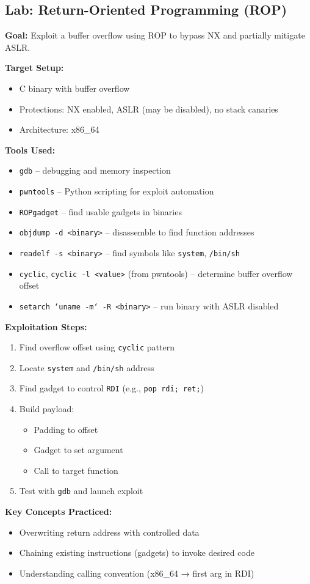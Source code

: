 \subsection{Lab: Return-Oriented Programming (ROP)}
{
\textbf{Goal:} Exploit a buffer overflow using ROP to bypass NX and partially mitigate ASLR.

\textbf{Target Setup:}
\begin{itemize}[noitemsep]
  \item C binary with buffer overflow
  \item Protections: NX enabled, ASLR (may be disabled), no stack canaries
  \item Architecture: x86\_64
\end{itemize}

\textbf{Tools Used:}
\begin{itemize}[noitemsep]
  \item \texttt{gdb} – debugging and memory inspection
  \item \texttt{pwntools} – Python scripting for exploit automation
  \item \texttt{ROPgadget} – find usable gadgets in binaries
  \item \texttt{objdump -d <binary>} – disassemble to find function addresses
  \item \texttt{readelf -s <binary>} – find symbols like \texttt{system}, \texttt{/bin/sh}
  \item \texttt{cyclic}, \texttt{cyclic -l <value>} (from pwntools) – determine buffer overflow offset
  \item \texttt{setarch `uname -m` -R <binary>} – run binary with ASLR disabled
\end{itemize}

\textbf{Exploitation Steps:}
\begin{enumerate}[noitemsep]
  \item Find overflow offset using \texttt{cyclic} pattern
  \item Locate \texttt{system} and \texttt{/bin/sh} address
  \item Find gadget to control \texttt{RDI} (e.g., \texttt{pop rdi; ret;})
  \item Build payload:
    \begin{itemize}
      \item Padding to offset
      \item Gadget to set argument
      \item Call to target function
    \end{itemize}
  \item Test with \texttt{gdb} and launch exploit
\end{enumerate}


\textbf{Key Concepts Practiced:}
\begin{itemize}[noitemsep]
  \item Overwriting return address with controlled data
  \item Chaining existing instructions (gadgets) to invoke desired code
  \item Understanding calling convention (x86\_64 → first arg in RDI)
\end{itemize}
}
